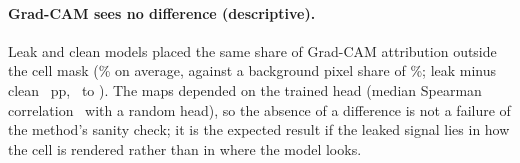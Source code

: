 \paragraph{Grad-CAM sees no difference (descriptive).} Leak and clean models placed the same
share of Grad-CAM attribution outside the cell mask (\CamBgAttribution\% on average, against a
background pixel share of \CamBgPixels\%; leak minus clean \CamLeakEst~pp, \CamLeakLo\ to
\CamLeakHi). The maps depended on the trained head (median Spearman correlation \CamSpearman\
with a random head), so the absence of a difference is not a failure of the method's sanity
check; it is the expected result if the leaked signal lies in how the cell is rendered rather
than in where the model looks.
